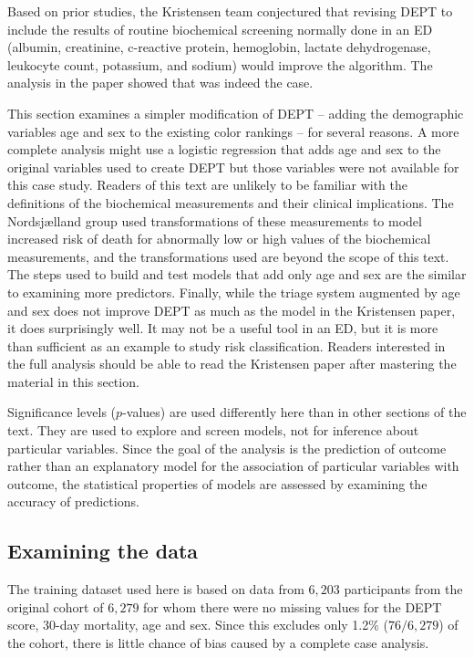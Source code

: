 Based on prior studies, the Kristensen team conjectured that revising DEPT to include the results of routine biochemical screening normally done in an ED (albumin, creatinine, c-reactive protein, hemoglobin, lactate dehydrogenase, leukocyte count, potassium, and sodium) would improve the algorithm.  The analysis in the paper showed that was indeed the case.

This section examines a simpler modification of DEPT -- adding the demographic variables age and sex to the existing color rankings -- for several reasons. A more complete analysis might use a logistic regression that adds age and sex to the original variables used to create DEPT but those variables were not available for this case study.   Readers of this text are unlikely to be familiar with the definitions of the biochemical measurements and their clinical implications. The Nordsj{\ae}lland group used transformations of these measurements to model increased risk of death for abnormally low or high values of the biochemical measurements, and the transformations used are beyond the scope of this text. The steps used to build and test models that add only age and sex are the similar to examining more predictors. Finally, while the triage system augmented by age and sex does not improve DEPT as much as the model in the Kristensen paper, it does surprisingly well.  It may not be a useful tool in an ED, but it is more than sufficient as an example to study risk classification.    Readers interested in the full analysis should be able to read the Kristensen paper after mastering the material in this section.

Significance levels ($p$-values) are used differently here than in other sections of the text.  They are used to explore and screen models, not for inference about particular variables.  Since the goal of the analysis is the prediction of outcome rather than an explanatory model for the association of particular variables with outcome, the statistical properties of models are assessed by examining the accuracy of predictions.  


\subsection{Examining the data}
\label{section:examiningDataDanishED}

The training dataset used here is based on data from $6,203$ participants from the original cohort of $6,279$ for whom there were no missing values for the DEPT score, 30-day mortality, age and sex.  Since this excludes only 1.2\% ($76/6,279$) of the cohort, there is little chance of bias caused by a complete case analysis.  

